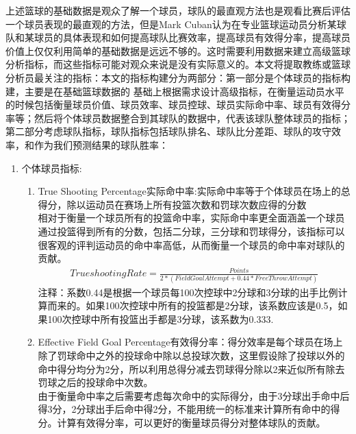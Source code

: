 上述篮球的基础数据是观众了解一个球员，球队的最直观方法也是观看比赛后评估一个球员表现的最直观的方法，但是Mark Cuban认为在专业篮球运动员分析某球队和某球员的具体表现和如何提高球队比赛效率，提高球员有效得分率，提高球员价值上仅仅利用简单的基础数据是远远不够的。这时需要利用数据来建立高级篮球分析指标，而这些指标可能对观众来说是没有实际意义的。本文将提取教练或篮球分析员最关注的指标：本文的指标构建分为两部分：第一部分是个体球员的指标构建，主要是在基础篮球数据的 基础上根据需求设计高级指标，在衡量运动员水平的时候包括衡量球员价值、球员效率、球员控球、球员实际命中率、球员有效得分率等；然后将个体球员数据整合到其球队的数据中，代表该球队整体球员的指标；第二部分考虑球队指标，球队指标包括球队排名、球队比分差距、球队的攻守效率，和作为我们预测结果的球队胜率：




\begin{enumerate}
	\item 个体球员指标:
	\begin{enumerate}
	
		
		
		
		
	
	
		\item True Shooting Percentage实际命中率:实际命中率等于个体球员在场上的总得分，除以运动员在赛场上所有投篮次数和罚球次数应得的分数 \\
		相对于衡量一个球员所有的投篮命中率，实际命中率更全面涵盖一个球员通过投篮得到所有的分数，包括二分球，三分球和罚球得分，该指标可以很客观的评判运动员的命中率高低，从而衡量一个球员的命中率对球队的贡献。\\
		
		\begin{align}
			True shooting Rate =  \frac{Points}{2*(Field Goal Attempt + 0.44*Free Throw Attempt)}
		\end{align}
		注释：系数0.44是根据一个球员每100次控球中2分球和3分球的出手比例计算而来的。如果100次控球中所有的投篮都是2分球，该系数应该是0.5，如果100次控球中所有投篮出手都是3分球，该系数为0.333.
	
		\item Effective Field Goal Percentage有效得分率：得分效率是每个球员在场上除了罚球命中之外的投球命中除以总投球次数，这里假设除了投球以外的命中得分均分为2分，所以利用总得分减去罚球得分除以2来近似所有除去罚球之后的投球命中次数。\\由于衡量命中率之后需要考虑每次命中的实际得分，由于3分球出手命中后得3分，2分球出手后命中得2分，不能用统一的标准来计算所有命中的得分。计算有效得分率，可以更好的衡量球员得分对整体球队的贡献。
		

\end{enumerate}
\end{enumerate}
